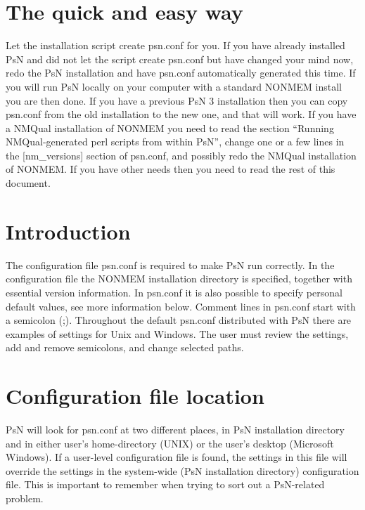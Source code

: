 


\maketitle

\section{The quick and easy way}
Let the installation script create psn.conf for you. If you have already installed PsN and did not let the script create psn.conf but have changed your mind now, redo the PsN installation and have psn.conf automatically generated this time. If you will run PsN locally on your computer with a standard NONMEM install you are then done.
If you have a previous PsN 3 installation then you can copy psn.conf from the old installation to the new one, and that will work.
If you have a NMQual installation of NONMEM you need to read the section  “Running  NMQual-generated perl scripts from within PsN”, change one or a few lines in the [nm\_versions] section of psn.conf, and possibly redo the NMQual installation of NONMEM. 
If you have other needs then you need to read the rest of this document.

\section{Introduction}
The configuration file psn.conf is required to make PsN run correctly. In the configuration file the NONMEM installation directory is specified, together with essential version information. In psn.conf it is also possible to specify personal default values, see more information below. Comment lines in psn.conf start with a semicolon (;). Throughout the default psn.conf distributed with PsN there are examples of settings for Unix and Windows. The user must review the settings, add and remove semicolons, and change selected paths.

\section{Configuration file location}
PsN will look for psn.conf at two different places, in PsN installation directory and in either
user's home-directory (UNIX) or the user's desktop (Microsoft Windows). If a user-level configuration file is found, the settings in this file will override the settings in the system-wide (PsN installation directory) configuration file. This is important to remember when trying to sort out a PsN-related problem.

